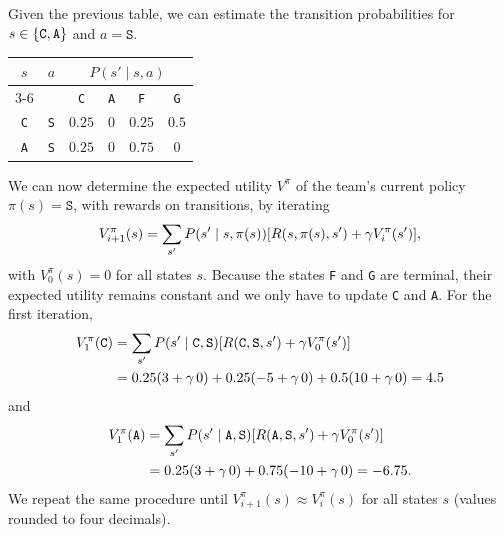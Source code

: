 \documentclass[11pt, a4paper]{exam}
\newcommand*{\C}{\texttt{C}}
\newcommand*{\A}{\texttt{A}}
\newcommand*{\F}{\texttt{F}}
\newcommand*{\G}{\texttt{G}}
\renewcommand*{\S}{\texttt{S}}
\begin{document}
\begin{exercises}
\begin{parts}
    \begin{solution}
        Given the previous table, we can estimate the transition probabilities for $s \in \cbk{\C, \A}$ and $a = \S$.

        \begin{center}
            \begin{tabular}{cccccc}
                \toprule
                $s$ & $a$ & \multicolumn{4}{c}{$P(s' \mid s, a)$} \\
                \cmidrule(lr){3-6}
                & & \C & \A & \F & \G \\
                \midrule
                \C & \S & $0.25$ & $0$ & $0.25$ & $0.5$ \\
                \A & \S & $0.25$ & $0$ & $0.75$ & $0$ \\
                \bottomrule
            \end{tabular}
        \end{center}

        We can now determine the expected utility $V^\pi$ of the team's current policy $\pi(s) = \S$, with rewards on transitions, by iterating
        \begin{equation*}
            V_{i + 1}^\pi(s) = \sum_{s'} P(s' \mid s, \pi(s)) \sbk*{R(s, \pi(s), s') + \gamma V_i^\pi(s')} ,
        \end{equation*}
        with $V_0^\pi(s) = 0$ for all states $s$. Because the states \F{} and \G{} are terminal, their expected utility remains constant and we only have to update \C{} and \A. For the first iteration,
        \begin{align*}
            V_1^\pi(\C) & = \sum_{s'} P(s' \mid \C, \S) \sbk*{R(\C, \S, s') + \gamma V_0^\pi(s')} \\
            & = 0.25 (3 + \gamma \, 0) + 0.25 (-5 + \gamma \, 0) + 0.5 (10 + \gamma \, 0) = 4.5
        \end{align*}
        and
        \begin{align*}
            V_1^\pi(\A) & = \sum_{s'} P(s' \mid \A, \S) \sbk*{R(\A, \S, s') + \gamma V_0^\pi(s')} \\
            & = 0.25 (3 + \gamma \, 0) + 0.75 (-10 + \gamma \, 0) = -6.75 .
        \end{align*}
        We repeat the same procedure until $V_{i + 1}^\pi(s) \approx V_i^\pi(s)$ for all states $s$ (values rounded to four decimals).


\end{solution}
\end{parts}
\end{exercises}
\end{document}
